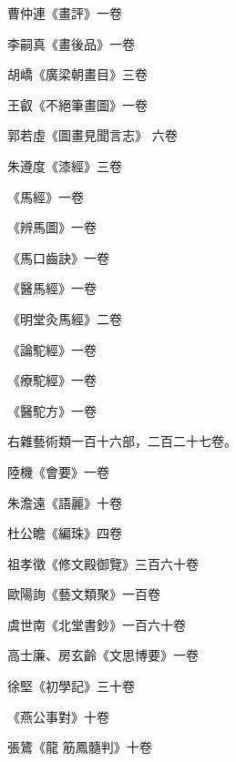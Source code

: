 \begin{pinyinscope}
 曹仲連《畫評》一卷



 李嗣真《畫後品》一卷



 胡嶠《廣梁朝畫目》三卷



 王叡《不絕筆畫圖》一卷



 郭若虛《圖畫見聞言志》
 六卷



 朱遵度《漆經》三卷



 《馬經》一卷



 《辨馬圖》一卷



 《馬口齒訣》一卷



 《醫馬經》一卷



 《明堂灸馬經》二卷



 《論駝經》一卷



 《療駝經》一卷



 《醫駝方》一卷



 右雜藝術類一百十六部，二百二十七卷。



 陸機《會要》一卷



 朱澹遠《語麗》十卷



 杜公瞻《編珠》四卷



 祖孝徵《修文殿御覽》三百六十卷



 歐陽詢《藝文類聚》一百卷



 虞世南《北堂書鈔》一百六十卷



 高士廉、房玄齡《文思博要》一卷



 徐堅《初學記》三十卷



 《燕公事對》十卷



 張鷟《龍
 筋鳳髓判》十卷




\end{pinyinscope}
